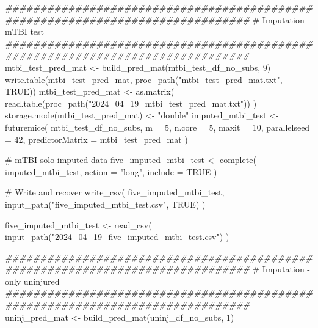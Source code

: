 \documentclass[
  letterpaper,
  DIV=11,
  numbers=noendperiod]{scrreprt}
\newenvironment{Shaded}{\begin{snugshade}}{\end{snugshade}}
\newcommand{\AttributeTok}[1]{\textcolor[rgb]{0.40,0.45,0.13}{#1}}
\newcommand{\CommentTok}[1]{\textcolor[rgb]{0.37,0.37,0.37}{#1}}
\newcommand{\ConstantTok}[1]{\textcolor[rgb]{0.56,0.35,0.01}{#1}}
\newcommand{\DecValTok}[1]{\textcolor[rgb]{0.68,0.00,0.00}{#1}}
\newcommand{\DocumentationTok}[1]{\textcolor[rgb]{0.37,0.37,0.37}{\textit{#1}}}
\newcommand{\FunctionTok}[1]{\textcolor[rgb]{0.28,0.35,0.67}{#1}}
\newcommand{\NormalTok}[1]{\textcolor[rgb]{0.00,0.23,0.31}{#1}}
\newcommand{\OtherTok}[1]{\textcolor[rgb]{0.00,0.23,0.31}{#1}}
\newcommand{\StringTok}[1]{\textcolor[rgb]{0.13,0.47,0.30}{#1}}
\begin{document}
\begin{Shaded}
\begin{Highlighting}[]
\DocumentationTok{\#\#\#\#\#\#\#\#\#\#\#\#\#\#\#\#\#\#\#\#\#\#\#\#\#\#\#\#\#\#\#\#\#\#\#\#\#\#\#\#\#\#\#\#\#\#\#\#\#\#\#\#\#\#\#\#\#\#\#\#\#\#\#\#\#\#\#\#\#\#\#\#\#\#\#\#\#\#\#}
\CommentTok{\# Imputation {-} mTBI test}
\DocumentationTok{\#\#\#\#\#\#\#\#\#\#\#\#\#\#\#\#\#\#\#\#\#\#\#\#\#\#\#\#\#\#\#\#\#\#\#\#\#\#\#\#\#\#\#\#\#\#\#\#\#\#\#\#\#\#\#\#\#\#\#\#\#\#\#\#\#\#\#\#\#\#\#\#\#\#\#\#\#\#\#}
\NormalTok{mtbi\_test\_pred\_mat }\OtherTok{\textless{}{-}} \FunctionTok{build\_pred\_mat}\NormalTok{(mtbi\_test\_df\_no\_subs, }\DecValTok{9}\NormalTok{)}
\FunctionTok{write.table}\NormalTok{(mtbi\_test\_pred\_mat, }\FunctionTok{proc\_path}\NormalTok{(}\StringTok{"mtbi\_test\_pred\_mat.txt"}\NormalTok{, }\ConstantTok{TRUE}\NormalTok{))}
\NormalTok{mtbi\_test\_pred\_mat }\OtherTok{\textless{}{-}} \FunctionTok{as.matrix}\NormalTok{(}
    \FunctionTok{read.table}\NormalTok{(}\FunctionTok{proc\_path}\NormalTok{(}\StringTok{"2024\_04\_19\_mtbi\_test\_pred\_mat.txt"}\NormalTok{))}
\NormalTok{)}
\FunctionTok{storage.mode}\NormalTok{(mtbi\_test\_pred\_mat) }\OtherTok{\textless{}{-}} \StringTok{"double"}
\NormalTok{imputed\_mtbi\_test }\OtherTok{\textless{}{-}} \FunctionTok{futuremice}\NormalTok{(}
\NormalTok{    mtbi\_test\_df\_no\_subs,}
    \AttributeTok{m =} \DecValTok{5}\NormalTok{,}
    \AttributeTok{n.core =} \DecValTok{5}\NormalTok{,}
    \AttributeTok{maxit =} \DecValTok{10}\NormalTok{,}
    \AttributeTok{parallelseed =} \DecValTok{42}\NormalTok{,}
    \AttributeTok{predictorMatrix =}\NormalTok{ mtbi\_test\_pred\_mat}
\NormalTok{)}

\CommentTok{\# mTBI solo imputed data}
\NormalTok{five\_imputed\_mtbi\_test }\OtherTok{\textless{}{-}} \FunctionTok{complete}\NormalTok{(}
\NormalTok{    imputed\_mtbi\_test,}
    \AttributeTok{action =} \StringTok{"long"}\NormalTok{,}
    \AttributeTok{include =} \ConstantTok{TRUE}
\NormalTok{)}

\CommentTok{\# Write and recover}
\FunctionTok{write\_csv}\NormalTok{(}
\NormalTok{    five\_imputed\_mtbi\_test,}
    \FunctionTok{input\_path}\NormalTok{(}\StringTok{"five\_imputed\_mtbi\_test.csv"}\NormalTok{, }\ConstantTok{TRUE}\NormalTok{)}
\NormalTok{)}

\NormalTok{five\_imputed\_mtbi\_test }\OtherTok{\textless{}{-}} \FunctionTok{read\_csv}\NormalTok{(}
    \FunctionTok{input\_path}\NormalTok{(}\StringTok{"2024\_04\_19\_five\_imputed\_mtbi\_test.csv"}\NormalTok{)}
\NormalTok{)}


\DocumentationTok{\#\#\#\#\#\#\#\#\#\#\#\#\#\#\#\#\#\#\#\#\#\#\#\#\#\#\#\#\#\#\#\#\#\#\#\#\#\#\#\#\#\#\#\#\#\#\#\#\#\#\#\#\#\#\#\#\#\#\#\#\#\#\#\#\#\#\#\#\#\#\#\#\#\#\#\#\#\#\#}
\CommentTok{\# Imputation {-} only uninjured}
\DocumentationTok{\#\#\#\#\#\#\#\#\#\#\#\#\#\#\#\#\#\#\#\#\#\#\#\#\#\#\#\#\#\#\#\#\#\#\#\#\#\#\#\#\#\#\#\#\#\#\#\#\#\#\#\#\#\#\#\#\#\#\#\#\#\#\#\#\#\#\#\#\#\#\#\#\#\#\#\#\#\#\#}
\NormalTok{uninj\_pred\_mat }\OtherTok{\textless{}{-}} \FunctionTok{build\_pred\_mat}\NormalTok{(uninj\_df\_no\_subs, }\DecValTok{1}\NormalTok{)}


\end{Highlighting}
\end{Shaded}
\end{document}
